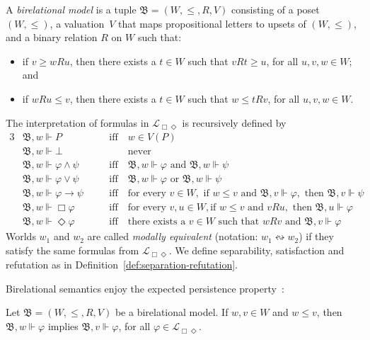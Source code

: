 \documentclass[submission,copyright,creativecommons]{eptcs}
\newcommand{\mo}{\mathfrak}
\newcommand{\B}{\mo{B}}
\newcommand{\ac}{R}
\newcommand{\logeq}{\leftrightsquigarrow}
\renewcommand{\phi}{\varphi}
\renewcommand{\iff}{\quad\text{iff}\quad}
\newcommand{\ML}{\mathcal{L}_{\Box\Diamond}}        %
\begin{document}
\begin{definition}
  A \emph{birelational model} is a tuple $\B = (W, \leq, R, V)$ consisting of
  a poset $(W, \leq)$, a valuation~$V$ that maps propositional letters to upsets of $(W, \leq)$,
  and a binary relation $R$ on $W$
  such that:
  \begin{itemize}\itemsep0pt
    \item if $v \geq w R u$, 
          then there exists a $t \in W$ such that $vRt \geq u$, for all $u, v, w \in W$; and
    \item if $w R u \leq v$, 
          then there exists a $t \in W$ such that $w \leq t R v$, for all $u, v, w \in W$.
  \end{itemize}
  The interpretation of formulas in $\ML$ is recursively defined by
  \begin{alignat*}{3}
    &\B, w \Vdash P
    &&\iff w \in V(P) \\
    &\B, w \Vdash \bot
    &%
    &\phantom{\iff}\text{never}
    \\
    &\B, w \Vdash \phi \land \psi
    &&\iff \B, w \Vdash \phi \text{ and } \B, w \Vdash \psi \\
    &\B, w \Vdash \phi \lor \psi
    &&\iff \B, w \Vdash \phi \text{ or } \B, w \Vdash \psi \\
    &\B,w \Vdash \phi \to \psi
    &&\iff\text{for every } v \in W,
          \text{ if } w \leq v
          \text{ and } \B, v \Vdash \phi,
          \text{ then } \B, v \Vdash \psi \\
    &\B, w \Vdash \Box\phi
    &&\iff\text{for every } v, u \in W,
          \text{if } w \leq v
          \text{ and } vRu,
          \text{ then } \B, u \Vdash \phi \\
    & \B, w \Vdash \Diamond\phi
    &&\iff\text{there exists a } v \in W
          \text{ such that } wRv
          \text{ and } \B, v \Vdash \phi
  \end{alignat*}
  Worlds $w_1$ and $w_2$ are called \emph{modally equivalent} (notation: $w_1 \logeq w_2$)
  if they satisfy the same formulas from $\ML$.
%
  We define separability, satisfaction and refutation as in
  Definition~\ref{def:separation-refutation}.
\end{definition}

  Birelational semantics enjoy the expected persistence property~\cite[Lemma~3.3.1]{Sim94}:

\begin{lemma}\label{lem:persistence}
  Let $\B = (W, \leq, \ac, V)$ be a birelational model.
  If $w, v \in W$ and $w \leq v$, then $\B, w \Vdash \phi$ implies $\B, v \Vdash \phi$, for all $\phi \in \ML$.
\end{lemma}
  
\end{document}
